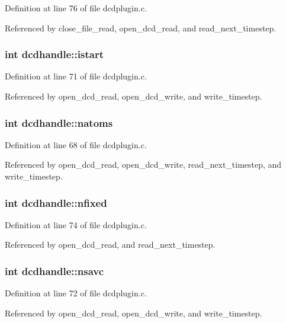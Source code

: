 Definition at line 76 of file dcdplugin.c.

Referenced by close\_\-file\_\-read, open\_\-dcd\_\-read, and read\_\-next\_\-timestep.
\subsubsection{\setlength{\rightskip}{0pt plus 5cm}int dcdhandle::istart}\label{structdcdhandle_m4}




Definition at line 71 of file dcdplugin.c.

Referenced by open\_\-dcd\_\-read, open\_\-dcd\_\-write, and write\_\-timestep.
\subsubsection{\setlength{\rightskip}{0pt plus 5cm}int dcdhandle::natoms}\label{structdcdhandle_m1}




Definition at line 68 of file dcdplugin.c.

Referenced by open\_\-dcd\_\-read, open\_\-dcd\_\-write, read\_\-next\_\-timestep, and write\_\-timestep.
\subsubsection{\setlength{\rightskip}{0pt plus 5cm}int dcdhandle::nfixed}\label{structdcdhandle_m7}




Definition at line 74 of file dcdplugin.c.

Referenced by open\_\-dcd\_\-read, and read\_\-next\_\-timestep.
\subsubsection{\setlength{\rightskip}{0pt plus 5cm}int dcdhandle::nsavc}\label{structdcdhandle_m5}




Definition at line 72 of file dcdplugin.c.

Referenced by open\_\-dcd\_\-read, open\_\-dcd\_\-write, and write\_\-timestep.
